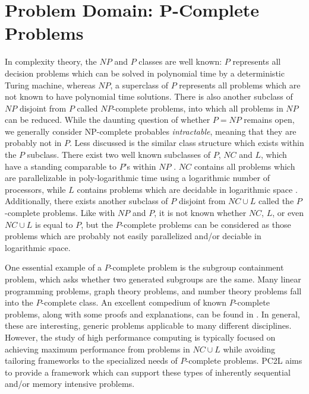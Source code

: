 \section{Problem Domain: P-Complete Problems}
In complexity theory, the $NP$ and $P$ classes are well known: $P$ represents all decision problems which can be solved in polynomial time by a deterministic Turing machine, whereas $NP$, a superclass of $P$  represents all problems which are not known to have polynomial time solutions. There is also another subclass of $NP$ disjoint from $P$  called $NP$-complete problems, into which all problems in $NP$ can be reduced. While the daunting question of whether $P = NP$ remains open, we generally consider NP-complete probables \textit{intractable}, meaning that they are probably not in $P$. Less discussed is the similar class structure which exists within the $P$ subclass. There exist two well known subclasses of $P$, $NC$ and $L$, which have a standing comparable to $P$'s within $NP$ \cite{Sipser_2006}. $NC$ contains all problems which are parallelizable in poly-logarithmic time using a logarithmic number of processors, while $L$ contains problems which are decidable in logarithmic space \cite{Greenlaw_Hoover_Ruzzo_1995}. Additionally, there exists another subclass of $P$ disjoint from $NC \cup L$ called the $P$-complete problems. Like with $NP$ and $P$, it is not known whether $NC$, $L$, or even $NC \cup L$ is equal to $P$, but the $P$-complete problems can be considered as those problems which are probably not easily parallelized and/or deciable in logarithmic space. 

One essential example of a $P$-complete problem is the subgroup containment problem, which asks whether two generated subgroups are the same. Many linear programming problems, graph theory problems, and number theory problems fall into the $P$-complete class. An excellent compedium of known $P$-complete problems, along with some proofs and explanations, can be found in \cite{Alvarez_Greenlaw_2000}. In general, these are interesting, generic problems applicable to many different disciplines. However, the study of high performance computing is typically focused on achieving maximum performance from problems in $NC \cup L$ while avoiding tailoring frameworks to the specialized needs of $P$-complete problems. PC2L aims to provide a framework which can support these types of inherently sequential and/or memory intensive problems. 

